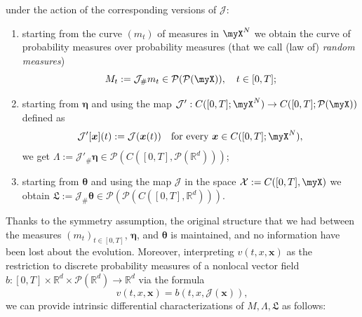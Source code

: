 \documentclass[10pt,leqno]{amsart}
\numberwithin{equation}{section}
\newcommand{\R}{\mathbb{R}}
\newcommand{\PP}{\mathcal{P}}
\begin{document}
under the action of 
the corresponding versions of $\mathcal J$:
\begin{enumerate}
    \item 
    starting from the curve $(m_t)$
    of measures in $\myX^N$
    we 
    obtain the curve of probability measures over probability measures (that we call (law of) \textit{random measures})
    \begin{equation}
    \label{eq: random measures associated to N-particle}
        M_t:=\mathcal{J}_\#m_t \in \PP(\PP(\myX)),\quad t\in [0,T];
    \end{equation}
    \item 
    starting from $\boldsymbol\eta$ 
    and using the map $\mathcal J':
    C([0,T];\myX^N)\to 
    C([0,T];\PP(\myX))$ 
    defined as 
    \[ \mathcal J'[\boldsymbol x](t):=\mathcal J(\boldsymbol x(t))\quad\text{for every }
    \boldsymbol x\in C([0,T];\myX^N),
    \]
    we get 
    $\Lambda := \mathcal{J}'_\#\boldsymbol{\eta} \in \PP(C([0,T],\PP(\R^d)))$;
    \item 
    starting from $\boldsymbol{\theta}$
    and using the map $\mathcal J$
    in the space
    $\mathcal X:=
    C([0,T],\myX)$
    we obtain
    $\mathfrak{L}:= \mathcal{J}_\#\boldsymbol{\theta}\in \PP(\PP(C([0,T],\R^d)))$.
\end{enumerate}
Thanks to the symmetry assumption, the original structure that we had between the measures $(m_t)_{t\in [0,T]}$, $\boldsymbol{\eta}$, and $\boldsymbol{\theta}$ is maintained, and no information have been lost about the evolution.
Moreover, interpreting $v(t,x,\boldsymbol x)$
as the restriction to discrete probability measures of a nonlocal vector field 
$b:[0,T]\times \R^d \times \PP(\R^d) \to \R^d$ 
via the formula 
\begin{equation}\label{non-local vf intro finite part system}
    v(t,x,\boldsymbol x)= b(t,x,\mathcal{J}(\boldsymbol x)),
\end{equation}
we can provide intrinsic differential characterizations of 
$M,\Lambda,\mathfrak{L}$ as follows:
\end{document}

